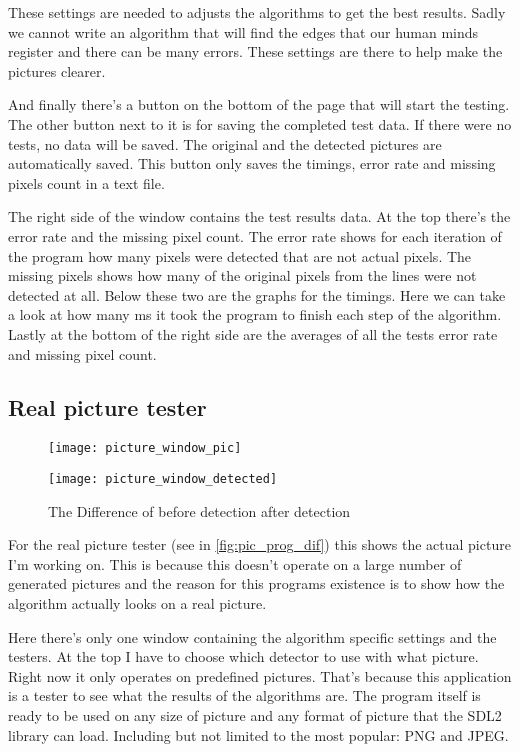 These settings are needed to adjusts the algorithms to get the best results. Sadly we cannot write an algorithm that will find the edges that our human minds register and there can be many errors. These settings are there to help make the pictures clearer.

And finally there's a button on the bottom of the page that will start the testing. The other button next to it is for saving the completed test data. If there were no tests, no data will be saved. The original and the detected pictures are automatically saved. This button only saves the timings, error rate and missing pixels count in a text file.

The right side of the window contains the test results data. At the top there's the error rate and the missing pixel count. The error rate shows for each iteration of the program how many pixels were detected that are not actual pixels. The missing pixels shows how many of the original pixels from the lines were not detected at all. Below these two are the graphs for the timings. Here we can take a look at how many \ac{ms} it took the program to finish each step of the algorithm. Lastly at the bottom of the right side are the averages of all the tests error rate and missing pixel count.

\subsection{Real picture tester}
\label{chap:real_pic_tester}

\begin{figure}[H]
\centering
\begin{minipage}[t]{.49\textwidth}
\centering
\texttt{[image: picture\_window\_pic]}
\end{minipage}
\begin{minipage}[t]{.49\textwidth}
\centering
\texttt{[image: picture\_window\_detected]}
\end{minipage}
\caption{The Difference of before detection after detection}
\label{fig:pic_prog_dif}
\end{figure}

For the real picture tester (see in \autoref{fig:pic_prog_dif}) this shows the actual picture I'm working on. This is because this doesn't operate on a large number of generated pictures and the reason for this programs existence is to show how the algorithm actually looks on a real picture.

Here there's only one window containing the algorithm specific settings and the testers. At the top I have to choose which detector to use with what picture. Right now it only operates on predefined pictures. That's because this application is a tester to see what the results of the algorithms are. The program itself is ready to be used on any size of picture and any format of picture that the \ac{SDL2} library can load. Including but not limited to the most popular: \ac{PNG} and \ac{JPEG}.

